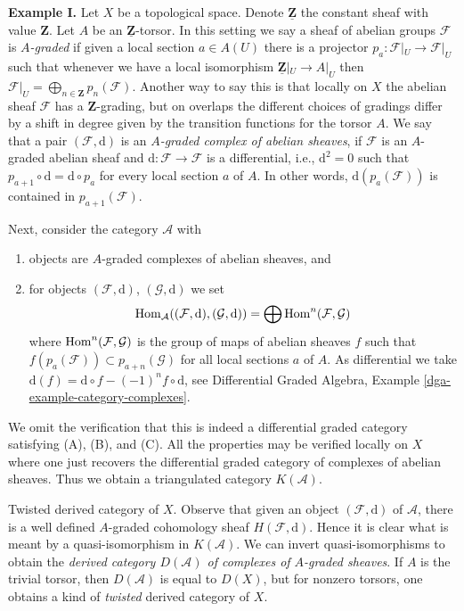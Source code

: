 \medskip\noindent
{\bf Example I.} Let $X$ be a topological space. Denote
$\underline{\mathbf{Z}}$ the constant sheaf with value $\mathbf{Z}$.
Let $A$ be an $\underline{\mathbf{Z}}$-torsor. In this setting we say
a sheaf of abelian groups $\mathcal{F}$ is {\it $A$-graded} if given a
local section $a \in A(U)$ there is a projector
$p_a : \mathcal{F}|_U \to \mathcal{F}|_U$ such that
whenever we have a local isomorphism $\underline{\mathbf{Z}}|_U \to A|_U$
then $\mathcal{F}|_U = \bigoplus_{n \in \mathbf{Z}} p_n(\mathcal{F})$.
Another way to say this is that locally on $X$ the abelian sheaf
$\mathcal{F}$ has a $\mathbf{Z}$-grading, but on overlaps the different
choices of gradings differ by a shift in degree given by the transition
functions for the torsor $A$.
We say that a pair $(\mathcal{F}, \text{d})$ is an
{\it $A$-graded complex of abelian sheaves}, if $\mathcal{F}$
is an $A$-graded abelian sheaf and $\text{d} : \mathcal{F} \to \mathcal{F}$
is a differential, i.e., $\text{d}^2 = 0$ such that
$p_{a + 1} \circ \text{d} = \text{d} \circ p_a$ for every local
section $a$ of $A$. In other words, $\text{d}(p_a(\mathcal{F}))$
is contained in $p_{a + 1}(\mathcal{F})$.

\medskip\noindent
Next, consider the category $\mathcal{A}$ with
\begin{enumerate}
\item objects are $A$-graded complexes of abelian sheaves, and
\item for objects $(\mathcal{F}, \text{d})$, $(\mathcal{G}, \text{d})$ we set
$$
\mathop{\mathrm{Hom}}\nolimits_\mathcal{A}((\mathcal{F}, \text{d}), (\mathcal{G}, \text{d})) =
\bigoplus \mathop{\mathrm{Hom}}\nolimits^n(\mathcal{F}, \mathcal{G})
$$
where $\mathop{\mathrm{Hom}}\nolimits^n(\mathcal{F}, \mathcal{G})$ is the group of
maps of abelian sheaves $f$ such that
$f(p_a(\mathcal{F})) \subset p_{a + n}(\mathcal{G})$ for all
local sections $a$ of $A$. As differential we take
$\text{d}(f) = \text{d} \circ f - (-1)^n f \circ \text{d}$, see
Differential Graded Algebra, Example \ref{dga-example-category-complexes}.
\end{enumerate}
We omit the verification that this is indeed a differential graded category
satisfying (A), (B), and (C). All the properties may be verified locally on
$X$ where one just recovers the differential graded category of complexes
of abelian sheaves. Thus we obtain a triangulated category
$K(\mathcal{A})$.

\medskip\noindent
Twisted derived category of $X$. Observe that given an object
$(\mathcal{F}, \text{d})$ of $\mathcal{A}$, there is a well defined
$A$-graded cohomology sheaf $H(\mathcal{F}, \text{d})$.
Hence it is clear what is meant by a quasi-isomorphism
in $K(\mathcal{A})$. We can invert quasi-isomorphisms
to obtain the {\it derived category $D(\mathcal{A})$ of complexes of
$A$-graded sheaves}. If $A$ is the trivial torsor, then $D(\mathcal{A})$
is equal to $D(X)$, but for nonzero torsors, one obtains a kind of
{\it twisted} derived category of $X$.

